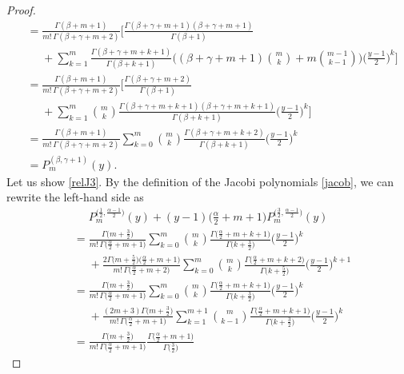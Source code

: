 \documentclass[reqno,11pt]{amsart}
\theoremstyle{definition}
\begin{document}
\begin{proof}
\begin{align*}
		&= \frac{\Gamma(\beta+m+1)}{m!\, \Gamma(\beta+\gamma+m+2)}\bigg[  \frac{\Gamma(\beta+\gamma+m+1)(\beta+\gamma+m+1)}{\Gamma(\beta+1)}\\
		&\phantom{=} +\sum_{k=1}^m \frac{\Gamma(\beta+\gamma+m+k+1)}{\Gamma(\beta+k+1)} \bigg( (\beta+\gamma+m+1)\binom{m}{k}+m \binom{m-1}{k-1}\bigg) \bigg(\frac{y-1}{2}\bigg)^{k}\bigg] \\
		&= \frac{\Gamma(\beta+m+1)}{m! \, \Gamma(\beta+\gamma+m+2)} \bigg[ \frac{\Gamma(\beta+\gamma+m+2)}{ \Gamma(\beta+1)} \\
		&\phantom{=}+\sum_{k=1}^m \binom{m}{k} \frac{\Gamma(\beta+\gamma+m+k+1)(\beta+\gamma+m+k+1)}{\Gamma(\beta+k+1)}\bigg(\frac{y-1}{2}\bigg)^{k} \bigg]\\
		&=  \frac{\Gamma(\beta+m+1)}{m! \, \Gamma(\beta+\gamma+m+2)}\sum_{k=0}^m \binom{m}{k} \frac{\Gamma(\beta+\gamma+m+k+2)}{\Gamma(\beta+k+1)}\bigg(\frac{y-1}{2}\bigg)^{k}\\
		&= P^{(\beta, \gamma+1)}_{m}(y).
	\end{align*}
	\endgroup
Let us show \eqref{relJ3}. By the definition of the Jacobi polynomials \eqref{jacob}, we can rewrite the left-hand side as
			\begingroup\allowdisplaybreaks
\begin{align*}
	&\phantom{=}P_m^{\big(\frac{1}{2},\frac{\alpha-1}{2}\big)}(y)
+(y-1)\Big(\frac{\alpha}{2}+m+1\Big)P_m^{\big(\frac{3}{2}, \frac{\alpha-1}{2}\big)}(y)\\
	&=\frac{\Gamma \big(m+\frac{3}{2}\big)}{m!\, \Gamma \big(\frac{\alpha}{2}+m+1\big)} \sum_{k=0}^{m} \binom{m}{k} \frac{\Gamma\big(\frac{\alpha}{2}+m+k+1\big)}{\Gamma \big(k+\frac{3}{2}\big)} \bigg(\frac{y-1}{2}\bigg)^k\\
	&\phantom{=}+\frac{2\Gamma \big(m+\frac{5}{2}\big)\big(\frac{\alpha}{2}+m+1\big)}{m!\, \Gamma\big(\frac{\alpha}{2}+m+2\big)} \sum_{k=0}^{m} \binom{m}{k} \frac{\Gamma\big(\frac{\alpha}{2}+m+k+2\big)}{\Gamma \big(k+\frac{5}{2}\big)} \bigg(\frac{y-1}{2}\bigg)^{k+1}\\
	&=\frac{\Gamma \big(m+\frac{3}{2}\big)}{m!\, \Gamma \big(\frac{\alpha}{2}+m+1\big)} \sum_{k=0}^{m} \binom{m}{k} \frac{\Gamma\big(\frac{\alpha}{2}+m+k+1\big)}{\Gamma \big(k+\frac{3}{2}\big)} \bigg(\frac{y-1}{2}\bigg)^k\\
	&\phantom{=}+\frac{(2m+3)\Gamma \big(m+\frac{3}{2}\big)}{m!\, \Gamma\big(\frac{\alpha}{2}+m+1\big)} \sum_{k=1}^{m+1} \binom{m}{k-1} \frac{\Gamma\big(\frac{\alpha}{2}+m+k+1\big)}{\Gamma \big(k+\frac{3}{2}\big)} \bigg(\frac{y-1}{2}\bigg)^{k}\\
	&=\frac{\Gamma \big(m+\frac{3}{2}\big)}{m!\, \Gamma \big(\frac{\alpha}{2}+m+1\big)} \frac{\Gamma \big(\frac{\alpha}{2}+m+1\big)}{\Gamma\big(\frac{3}{2}\big)}

\end{align*}
\end{proof}
\end{document}
